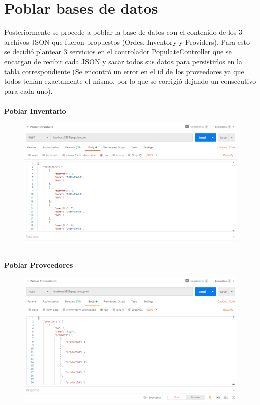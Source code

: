 \documentclass{article}
\begin{document}
\section{Poblar bases de datos}
Posteriormente se procede a poblar la base de datos con el contenido de los 3 archivos JSON que fueron propuestos (Ordes, Inventory y Providers). Para esto se decidió plantear 3 servicios en el controlador PopulateController que se encargan de recibir cada JSON y sacar todos sus datos para persistirlos en la tabla correspondiente (Se encontró un error en el id de los proveedores ya que todos tenían exactamente el mismo, por lo que se corrigió dejando un consecutivo para cada uno).
\\\\
\textbf{Poblar Inventario}
\begin{figure}[h!]
\centering
\includegraphics[scale=0.4]{Pinv.png}
\end{figure}
\\
\textbf{Poblar Proveedores}
\begin{figure}[h!]
\centering
\includegraphics[scale=0.4]{Pprov.png}
\end{figure}
\end{document}
